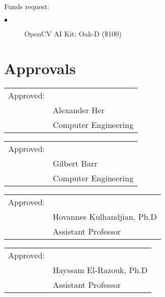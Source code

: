 \documentclass[12pt,onecolumn]{IEEEtran}			%
\begin{document}
Funds request:
 \begin{description}
  \item[$\bullet$ ] OpenCV AI Kit: Oak-D (\$100)
\end{description}

 
 \section{Approvals}
\vspace{12pt} 
\vspace{12pt} 



\begin{tabular}{@{}p{.5in}p{4in}@{}}
Approved: & \hrulefill \\
& Alexander Her \\
& Computer Engineering\\
\end{tabular}
\vspace{12pt} 

\begin{tabular}{@{}p{.5in}p{4in}@{}}
Approved: & \hrulefill \\
& Gilbert Barr \\
& Computer Engineering\\
\end{tabular}
\vspace{12pt} 

\begin{tabular}{@{}p{.5in}p{4in}@{}}
Approved: & \hrulefill \\
& Hovannes Kulhandjian, Ph.D \\
& Assistant Professor\\
\end{tabular}
\vspace{12pt} 

\begin{tabular}{@{}p{.5in}p{4in}@{}}
Approved: & \hrulefill \\
& Hayssam El-Razouk, Ph.D \\
& Assistant Professor\\
\end{tabular}


\newpage
~\cite{lu2018survey}
~\cite{mishra2019introduction}
~\cite{shanmugamani2018deep}


 
\end{document}
